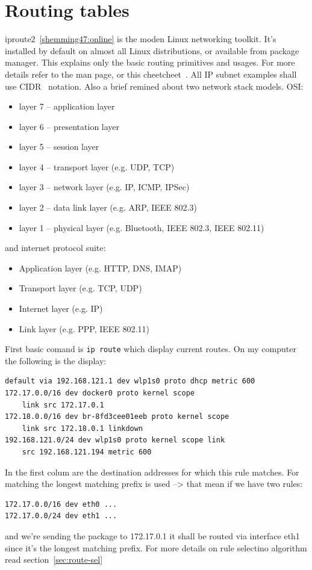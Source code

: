 \documentclass[times, utf8, seminar, english]{fer}
\begin{document}
\chapter{Routing tables}
iproute2~\ref{shemming47:online} is the moden Linux networking toolkit. It's installed by default on almost all Linux distributions, or available from package manager. This explains only the basic routing primitives and usages. For more details refer to the man page, or this cheetcheet~\cite{iproute285:online}. All IP subnet examples shall use CIDR~\cite{Classles63:online} notation. Also a brief remined about two network stack models. OSI:
    \begin{itemize}
        \item layer 7 -- application layer
        \item layer 6 -- presentation layer
        \item layer 5 -- session layer
        \item layer 4 -- transport layer (e.g. UDP, TCP)
        \item layer 3 -- network layer (e.g. IP, ICMP, IPSec)
        \item layer 2 -- data link layer (e.g. ARP, IEEE 802.3)
        \item layer 1 -- physical layer (e.g. Bluetooth, IEEE 802.3, IEEE 802.11)
    \end{itemize}
    and internet protocol suite:
    \begin{itemize}
        \item Application layer (e.g. HTTP, DNS, IMAP)
        \item Transport layer (e.g. TCP, UDP)
        \item Internet layer (e.g. IP)
        \item Link layer (e.g. PPP, IEEE 802.11)
    \end{itemize}

First basic comand is \verb|ip route| which display current routes. On my computer the following is the display:
\begin{verbatim}
default via 192.168.121.1 dev wlp1s0 proto dhcp metric 600
172.17.0.0/16 dev docker0 proto kernel scope
    link src 172.17.0.1
172.18.0.0/16 dev br-8fd3cee01eeb proto kernel scope
    link src 172.18.0.1 linkdown
192.168.121.0/24 dev wlp1s0 proto kernel scope link
    src 192.168.121.194 metric 600
\end{verbatim}
In the first colum are the destination addresses for which this rule matches. For matching the longest matching prefix is used --> that mean if we have two rules:
\begin{verbatim}
172.17.0.0/16 dev eth0 ...
172.17.0.0/24 dev eth1 ...
\end{verbatim}
and we're sending the package to 172.17.0.1 it shall be routed via interface eth1 since it's the longest matching prefix. For more details on rule selectino algorithm read section~\ref{sec:route-sel}
\end{document}
